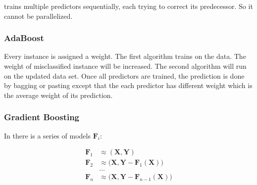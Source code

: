  trains multiple predictors sequentially, each trying to correct its predecessor. So it cannot be parallelized.


\subsubsection{AdaBoost}

Every instance is assigned a weight. The first algorithm trains on the data. The weight of misclassified instance will be increased. The second algorithm will run on the updated data set. Once all predictors are trained, the prediction is done by bagging or pasting except that the each predictor has different weight which is the average weight of its prediction.


\subsubsection{Gradient Boosting}

In  there is a series of models $\mathbf{F}_i$:

\begin{equation}
	\begin{aligned}
		\mathbf{F}_1 &\approx (\mathbf{X},\mathbf{Y}) \\
		\mathbf{F}_2 &\approx \Big(\mathbf{X},\mathbf{Y} - \mathbf{F}_1 (\mathbf{X}) \Big ) \\
		&\dots \\
		\mathbf{F}_n &\approx \Big(\mathbf{X},\mathbf{Y} - \mathbf{F}_{n-1} (\mathbf{X}) \Big )
	\end{aligned}
\end{equation}


